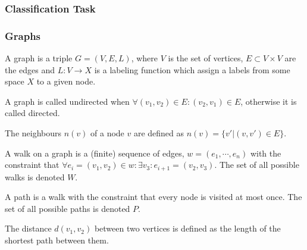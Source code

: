 

\subsubsection{Classification Task}

\subsubsection{Graphs}
A graph is a triple $G = (V, E, L)$, where $V$ is the set of vertices, $E \subset V \times V$ are the edges and $L: V \to X$ is a labeling function which assign a labels from some space $X$ to a given node.

A graph is called undirected when $\forall (v_1, v_2) \in E: (v_2, v_1) \in E$, otherwise it is called directed.

The neighbours $n(v)$ of a node $v$ are defined as $n(v) = \{v' | (v, v') \in E \}$.



A walk on a graph is a (finite) sequence of edges, $w = (e_1, \cdots, e_n)$ with the constraint that $\forall e_i = (v_1, v_2) \in w: \exists v_3: e_{i + 1} = (v_2, v_3)$.
The set of all possible walks is denoted $W$.

A path is a walk with the constraint that every node is visited at most once.
The set of all possible paths is denoted $P$.

The distance $d(v_1, v_2)$ between two vertices is defined as the length of the shortest path between them.

